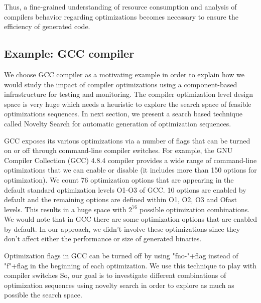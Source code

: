 Thus, a fine-grained understanding of resource
consumption and analysis of compilers behavior regarding
optimizations becomes necessary to ensure the efficiency of generated code.

\subsection{Example: GCC compiler}
We choose GCC compiler as a motivating example in order to explain how we would study the impact of compiler optimizations using a component-based infrastructure for testing and monitoring.
The compiler optimization level design space is very huge which needs a heuristic to explore the search space of feasible optimizations sequences. In next section, we present a search based technique called Novelty Search for automatic generation of optimization sequences. 

GCC exposes its various optimizations via a number of flags that can be turned on or off through command-line compiler switches. For example, the GNU Compiler Collection (GCC) 4.8.4 compiler provides a wide range of command-line optimizations that we can enable or disable (it includes more than 150 options for optimization). We count 76 optimization options that are appearing in the default standard optimization levels O1-O3 of GCC. 10 options are enabled by default and the remaining options are defined within O1, O2, O3 and Ofast levels.
This results in a huge space with $2^{76}$ possible optimization
combinations.
We would note that in GCC there are some optimization options that are enabled by default. In our approach, we didn't involve these optimizations since they don't affect either the performance or size of generated binaries.

Optimization flags in GCC can be turned off by using "fno-"+flag instead of "f"+flag in the beginning of each optimization. We use this technique to play with compiler switches
So, our goal is to investigate different combinations of optimization sequences using novelty search in order to explore as much as possible the search space. 


